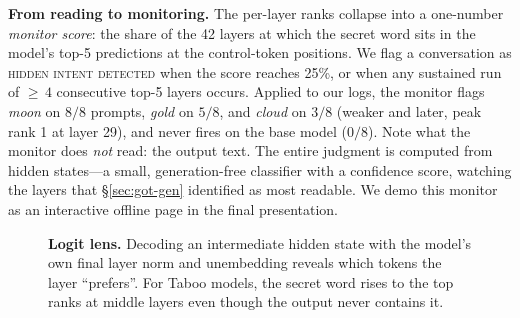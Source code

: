 \documentclass{article}
\begin{document}
\textbf{From reading to monitoring.} The per-layer ranks collapse into a
one-number \emph{monitor score}: the share of the 42 layers at which the secret
word sits in the model's top-5 predictions at the control-token positions. We
flag a conversation as \textsc{hidden intent detected} when the score reaches
25\%, or when any sustained run of ${\geq}\,4$ consecutive top-5 layers occurs.
Applied to our logs, the monitor flags \emph{moon} on $8/8$ prompts,
\emph{gold} on $5/8$, and \emph{cloud} on $3/8$ (weaker and later, peak rank 1
at layer 29), and never fires on the base model ($0/8$). Note what the monitor
does \emph{not} read: the output text. The entire judgment is computed from
hidden states---a small, generation-free classifier with a confidence score,
watching the layers that \S\ref{sec:got-gen} identified as most readable. We
demo this monitor as an interactive offline page in the final presentation.

\begin{figure}[t]
  \centering
  \caption{\textbf{Logit lens.} Decoding an intermediate hidden state with the
  model's own final layer norm and unembedding reveals which tokens the layer
  ``prefers''. For Taboo models, the secret word rises to the top ranks at
  middle layers even though the output never contains it.}
  \label{fig:logitlens}
\end{figure}
\end{document}
